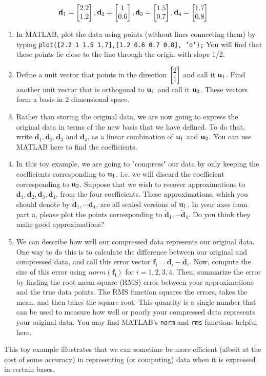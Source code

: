 \begin{prob}
\begin{enumerate}
    \begin{align}
    \mathbf{d}_1 = \begin{bmatrix} 2.2 \\ 1.2 \end{bmatrix} , \mathbf{d}_2 = \begin{bmatrix} 1 \\ 0.6 \end{bmatrix}, \mathbf{d}_3 = \begin{bmatrix} 1.5 \\ 0.7 \end{bmatrix}, \mathbf{d}_4 = \begin{bmatrix} 1.7 \\ 0.8 \end{bmatrix}
    \end{align}


    \begin{enumerate}
    \item In MATLAB, plot the data using points (without lines connecting them) by typing \texttt{plot([2.2 1 1.5 1.7],[1.2 0.6 0.7 0.8], 'o');} You will find that these points lie close to the line through the origin with slope 1/2.

    \item  Define a unit vector that points in the direction $\begin{bmatrix} 2 \\ 1 \end{bmatrix}$ and call it $\mathbf{u}_1$. Find another unit vector that is orthogonal to $\mathbf{u}_1$ and call it $\mathbf{u}_2$. These vectors form a basis in 2 dimensional space.

    \item Rather than storing the original data, we are now going to express the original data in terms of the new basis that we have defined. To do that, write $\mathbf{d}_1, \mathbf{d}_2, \mathbf{d}_3$ and $\mathbf{d}_4$, as a linear combination of $\mathbf{u}_1$ and $\mathbf{u}_2$. You can use MATLAB here to find the coefficients.

    \item In this toy example, we are going to "compress" our data by only keeping the coefficients corresponding to $\mathbf{u}_1$. i.e. we will discard the coefficient corresponding to $\mathbf{u}_2$. Suppose that we wish to recover approximations to $\mathbf{d}_1, \mathbf{d}_2, \mathbf{d}_3, \mathbf{d}_4$, from the four coefficients. These approximations, which you should denote by $\tilde{\mathbf{d}}_1, \cdots \tilde{\mathbf{d}}_4$, are all scaled versions of $\mathbf{u}_1$. In your axes from part a, please plot the points corresponding to $\tilde{\mathbf{d}}_1, \cdots \tilde{\mathbf{d}}_4$. Do you think they make good approximations?

    \item We can describe how well our compressed data represents our original data. One way to do this is to calculate the difference between our original and compressed data, and call this error vector $\mathbf{f_i}=\mathbf{d}_i - \tilde{\mathbf{d}}_i$. Now, compute the size of this error using $norm(\mathbf{f_i})$ for $i = 1, 2, 3, 4$. Then, summarize the error by finding the root-mean-square (RMS) error between your approximations and the true data points. The RMS function squares the errors, takes the mean, and then takes the square root. This quantity is a single number that can be used to measure how well or poorly your compressed data represents your original data. You may find MATLAB's \texttt{norm} and \texttt{rms} functions helpful here.
    \end{enumerate}
    This toy example illustrates that we can sometime be more efficient (albeit at the cost of some accuracy) in representing (or computing) data when it is expressed in certain bases.
\end{enumerate}
\end{prob}
